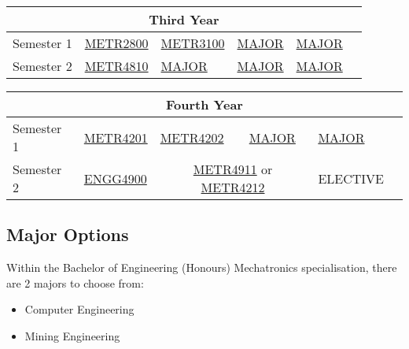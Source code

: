 \begin{table}[H]
    \centering
    \begin{tabular}{| m{6em} | m{5em} m{5em} m{5em} m{5em} m{5em} |}
        \hline
        \multicolumn{6}{|c|}{\bfseries Third Year} \\
        \hline
        Semester 1 & \hyperlink{METR2800}{METR2800} & \hyperlink{METR3100}{METR3100} & \hyperlink{MAJOR}{MAJOR} & \hyperlink{MAJOR}{MAJOR} & \\
        Semester 2 & \hyperlink{METR4810}{METR4810} & \hyperlink{MAJOR}{MAJOR} & \hyperlink{MAJOR}{MAJOR} & \hyperlink{MAJOR}{MAJOR} & \\
        \hline
    \end{tabular}
\end{table}
\begin{table}[H]
    \centering
    \begin{tabular}{| m{6em} | m{5em} m{5em} m{5em} m{5em} m{5em} |}
        \hline
        \multicolumn{6}{|c|}{\bfseries Fourth Year} \\
        \hline
        Semester 1 & \hyperlink{METR4201}{METR4201} & \hyperlink{METR4202}{METR4202} & \hyperlink{MAJOR}{MAJOR} & \hyperlink{MAJOR}{MAJOR} & \\
        Semester 2 & \hyperlink{ENGG4900}{ENGG4900} & \multicolumn{2}{c}{\hyperlink{METR4911}{METR4911} or \hyperlink{METR4212}{METR4212}} & ELECTIVE & \\
        \hline
    \end{tabular}
\end{table}
\renewcommand{\arraystretch}{1}

\newpage

\hypertarget{MAJOR}{\subsection{Major Options}} 
Within the Bachelor of Engineering (Honours) Mechatronics specialisation, there are 2 majors to choose from:
\begin{itemize}
    \item Computer Engineering
    \item Mining Engineering
\end{itemize}

